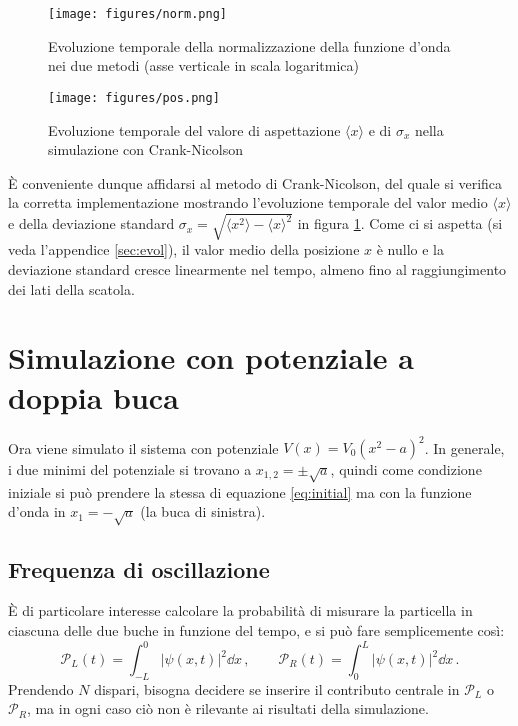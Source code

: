 \documentclass[a4paper, titlepage]{article}
\numberwithin{equation}{section}
\begin{document}
\begin{figure}[h!]
    \centering
    \begin{minipage}{0.47 \textwidth}
        \centering
        \texttt{[image: figures/norm.png]}
        \caption{Evoluzione temporale della normalizzazione della funzione d'onda nei due metodi (asse verticale in scala logaritmica)}
        \label{fig:norm}
    \end{minipage}
    \hspace{0.02\textwidth}
    \begin{minipage}{0.47 \textwidth}
        \centering
        \texttt{[image: figures/pos.png]}
        \caption{Evoluzione temporale del valore di aspettazione $\langle x \rangle$ e di $\sigma_x$ nella simulazione con Crank-Nicolson}
        \label{fig:pos}
    \end{minipage}
\end{figure}

È conveniente dunque affidarsi al metodo di Crank-Nicolson, del quale si verifica la corretta implementazione mostrando l'evoluzione temporale del valor medio $\langle x \rangle$ e della deviazione standard $\sigma_x = \sqrt{\langle x^2 \rangle - \langle x \rangle^2}$ in figura \ref{fig:pos}. Come ci si aspetta (si veda l'appendice \ref{sec:evol}), il valor medio della posizione $x$ è nullo e la deviazione standard cresce linearmente nel tempo, almeno fino al raggiungimento dei lati della scatola.


\section{Simulazione con potenziale a doppia buca}

Ora viene simulato il sistema con potenziale $V(x) = V_0(x^2-a)^2$. In generale, i due minimi del potenziale si trovano a $x_{1,2} = \pm \sqrt{a}$, quindi come condizione iniziale si può prendere la stessa di equazione \eqref{eq:initial} ma con la funzione d'onda in $x_1 = -\sqrt{a}$ (la buca di sinistra). 

\subsection{Frequenza di oscillazione}

È di particolare interesse calcolare la probabilità di misurare la particella in ciascuna delle due buche in funzione del tempo, e si può fare semplicemente così:
\[
    \mathcal{P}_L(t) = \int_{-L}^0 |\psi(x,t)|^2 \dd x\, ,
    \qquad
    \mathcal{P}_R(t) = \int_0^L |\psi(x,t)|^2 \dd x\, .
\]
Prendendo $N$ dispari, bisogna decidere se inserire il contributo centrale in $\mathcal{P}_L$ o  $\mathcal{P}_R$, ma in ogni caso ciò non è rilevante ai risultati della simulazione. 
\end{document}
